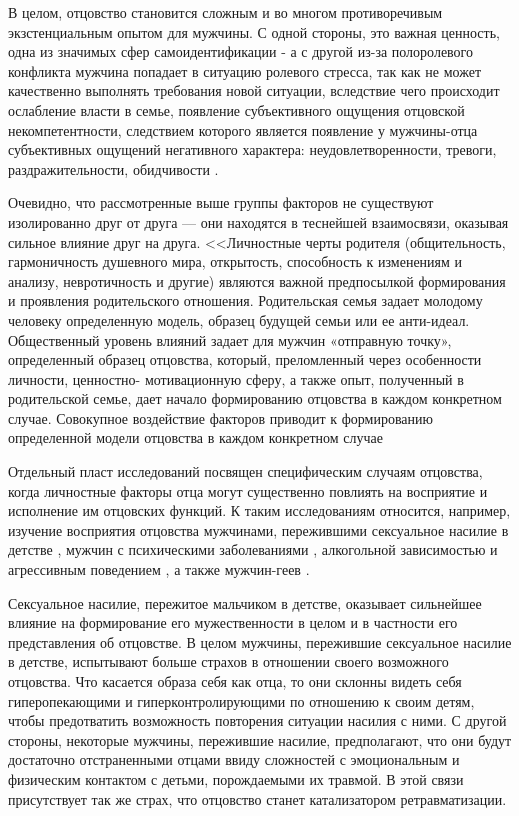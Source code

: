 \documentclass{../../common/thesisbyxetex}
\begin{document}
В целом, отцовство становится сложным и во многом противоречивым экзстенциальным опытом для
мужчины.
 С одной стороны, это важная ценность, одна из
значимых сфер самоидентификации - а с другой из-за полоролевого конфликта  мужчина попадает в
ситуацию ролевого стресса, так как не может
качественно выполнять требования новой ситуации, вследствие чего происходит
ослабление власти в семье, появление субъективного ощущения отцовской
некомпетентности, следствием которого является появление у мужчины-отца
субъективных ощущений негативного характера: неудовлетворенности, тревоги,
раздражительности, обидчивости \cite[111]{confl}.


Очевидно, что рассмотренные выше группы факторов не существуют изолированно друг от друга --- они
находятся в теснейшей взаимосвязи, оказывая сильное влияние друг на друга. <<Личностные черты
родителя
(общительность, гармоничность душевного мира, открытость, способность к
изменениям и анализу, невротичность и другие) являются важной предпосылкой
формирования и проявления родительского отношения. Родительская семья задает
молодому человеку определенную модель, образец будущей семьи или ее анти-идеал.
Общественный уровень влияний задает для мужчин «отправную точку», определенный
образец отцовства, который, преломленный через особенности личности, ценностно-
мотивационную сферу, а также опыт, полученный в родительской семье, дает начало
формированию отцовства в каждом конкретном случае. Совокупное воздействие
факторов приводит к формированию определенной модели отцовства в каждом
конкретном случае \cite[122]{har}

Отдельный пласт исследований посвящен специфическим случаям отцовства, когда личностные факторы
отца могут существенно повлиять на восприятие и исполнение им отцовских функций. К таким
исследованиям относится, например, изучение восприятия отцовства мужчинами, пережившими сексуальное
насилие в детстве \cite{sex}, мужчин с психическими заболеваниями \cite{gbi}, алкогольной
зависимостью и агрессивным поведением \cite{alc}, а также мужчин-геев \cite{gay}.

Сексуальное насилие, пережитое мальчиком в детстве, оказывает сильнейшее влияние на формирование
его мужественности в целом и в частности его представления об отцовстве. В целом мужчины,
пережившие сексуальное насилие в детстве, испытывают больше страхов в отношении своего возможного
отцовства.  Что касается образа себя как отца, то они склонны видеть себя гиперопекающими  и
гиперконтролирующими по отношению к своим детям, чтобы предотватить возможность повторения
ситуации насилия с ними. С другой стороны, некоторые мужчины, пережившие насилие, предполагают,
что они будут достаточно отстраненными отцами ввиду сложностей с эмоциональным и физическим
контактом с детьми, порождаемыми их травмой. В этой связи присутствует так же страх, что отцовство
станет катализатором ретравматизации.
\end{document}
